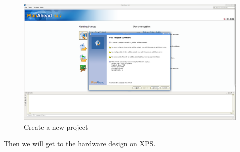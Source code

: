 \documentclass{article}
\begin{document}
\begin{enumerate}
\begin{figure}
	\includegraphics[scale=0.25]{pictures/CreateNewProject5.png}
	\caption{Create a new project}
	\end{figure}
	\end{enumerate}

	Then we will get to the hardware design on XPS.
\end{document}
